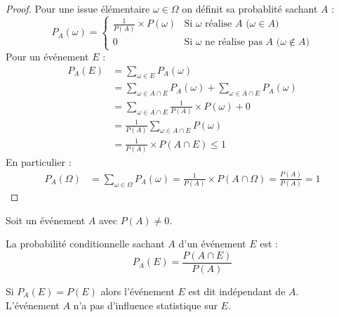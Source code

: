 \documentclass[main.tex]{subfiles}
\begin{document}
\begin{proof}   Pour une issue élémentaire $\omega\in\Omega$ on définit sa probablité sachant $A$ : 
	\setlength{\abovedisplayskip}{3pt}
	\setlength{\belowdisplayskip}{3pt}	
	$$
	P_A(\omega)=\begin{cases}
		\frac{1}{P(A)}\times P(\omega)& \text{Si $\omega$  réalise $A$ ($\omega\in A$)}\\
		0& \text{Si $\omega$ ne réalise pas $A$ ($\omega\notin A$)}
	\end{cases}
	$$
	Pour un événement $E$ :
	\setlength{\abovedisplayskip}{3pt}
	\setlength{\belowdisplayskip}{3pt}	
	\begin{align*}
		P_A(E)&=\sum_{\omega\in E} P_A(\omega)\\
		& = \sum_{\omega\in A\cap E} P_A(\omega) +\sum_{\omega\in \overline{A}\cap E} P_A(\omega) \\
		& =  \sum_{\omega\in A\cap E} \frac{1}{P(A)}\times P(\omega) + 0\\
		& = \frac{1}{P(A)} \sum_{\omega\in A\cap E}P(\omega) \\
		& = \frac{1}{P(A)}\times P(A\cap E) \leqslant 1 
	\end{align*} 
	En particulier :
	\begin{align*}
		P_A(\Omega)&=	\sum_{\omega\in\Omega} P_A(\omega)   = \frac{1}{P(A)}\times P(A\cap \Omega) = \frac{P(A)}{P(A)}=1
	\end{align*} 
\end{proof}  
\begin{definition} Soit un événement $A$ avec $P(A) \neq  0$.
	
	\noindent La probabilité conditionnelle sachant $A$  d'un événement $E$ est  :  
	\setlength{\abovedisplayskip}{3pt}
	\setlength{\belowdisplayskip}{3pt}
	$$ 
	P_A(E)=\frac{P(A\cap E)}{P(A)}
	$$
\end{definition}
\begin{definition} Si $P_A(E)=P(E)$ alors l’événement $E$ est dit indépendant de $A$.\\
	L'événement $A$ n'a pas d'influence statistique sur $E$.
\end{definition}
\end{document}
